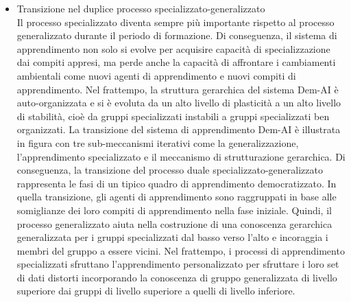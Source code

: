 \begin{itemize}
\item Transizione nel duplice processo specializzato-generalizzato\\
Il processo specializzato diventa sempre più importante rispetto al processo generalizzato durante il periodo di formazione. Di conseguenza, il sistema di apprendimento non solo si evolve per acquisire capacità di specializzazione dai compiti appresi, ma perde anche la capacità di affrontare i cambiamenti ambientali come nuovi agenti di apprendimento e nuovi compiti di apprendimento. Nel frattempo, la struttura gerarchica del sistema Dem-AI è auto-organizzata e si è evoluta da un alto livello di plasticità a un alto livello di stabilità, cioè da gruppi specializzati instabili a gruppi specializzati ben organizzati. La transizione del sistema di apprendimento Dem-AI è illustrata in figura con tre sub-meccanismi iterativi come la generalizzazione, l'apprendimento specializzato e il meccanismo di strutturazione gerarchica. Di conseguenza, la transizione del processo duale specializzato-generalizzato rappresenta le fasi di un tipico quadro di apprendimento democratizzato. In quella transizione, gli agenti di apprendimento sono raggruppati in base alle somiglianze dei loro compiti di apprendimento nella fase iniziale. Quindi, il processo generalizzato aiuta nella costruzione di una conoscenza gerarchica generalizzata per i gruppi specializzati dal basso verso l'alto e incoraggia i membri del gruppo a essere vicini. Nel frattempo, i processi di apprendimento specializzati sfruttano l'apprendimento personalizzato per sfruttare i loro set di dati distorti incorporando la conoscenza di gruppo generalizzata di livello superiore dai gruppi di livello superiore a quelli di livello inferiore.

\end{itemize}
